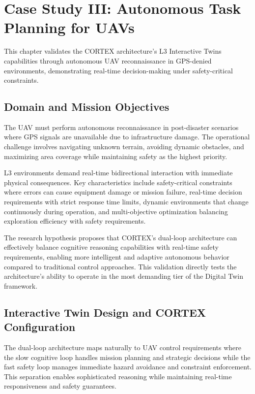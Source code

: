 
\chapter{Case Study III: Autonomous Task Planning for UAVs} \label{chp:uav}

This chapter validates the CORTEX architecture's L3 Interactive Twins capabilities through autonomous UAV reconnaissance in GPS-denied environments, demonstrating real-time decision-making under safety-critical constraints.

\section{Domain and Mission Objectives}

The UAV must perform autonomous reconnaissance in post-disaster scenarios where GPS signals are unavailable due to infrastructure damage. The operational challenge involves navigating unknown terrain, avoiding dynamic obstacles, and maximizing area coverage while maintaining safety as the highest priority.

L3 environments demand real-time bidirectional interaction with immediate physical consequences. Key characteristics include safety-critical constraints where errors can cause equipment damage or mission failure, real-time decision requirements with strict response time limits, dynamic environments that change continuously during operation, and multi-objective optimization balancing exploration efficiency with safety requirements.

The research hypothesis proposes that CORTEX's dual-loop architecture can effectively balance cognitive reasoning capabilities with real-time safety requirements, enabling more intelligent and adaptive autonomous behavior compared to traditional control approaches. This validation directly tests the architecture's ability to operate in the most demanding tier of the Digital Twin framework.

\section{Interactive Twin Design and CORTEX Configuration}

The dual-loop architecture maps naturally to UAV control requirements where the slow cognitive loop handles mission planning and strategic decisions while the fast safety loop manages immediate hazard avoidance and constraint enforcement. This separation enables sophisticated reasoning while maintaining real-time responsiveness and safety guarantees.

